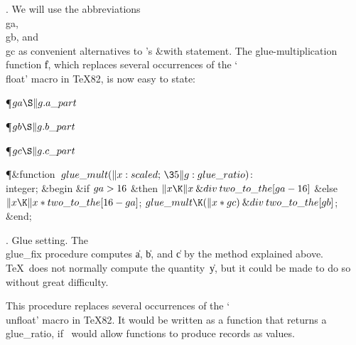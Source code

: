 . We will use the abbreviations \\{ga}, \\{gb}, and \\{gc} as convenient
alternatives to \PASCAL's \&{with} statement. The glue-multiplication
function \|f, which replaces several occurrences of the `\\{float}' macro
in \TeX82, is now easy to state:

\Y\P\D {}$\\{ga}\S\|g.\\{a\_part}$\par
\P\D {}$\\{gb}\S\|g.\\{b\_part}$\par
\P\D {}$\\{gc}\S\|g.\\{c\_part}$\par
\Y\P\4\&{function}\1\  $\\{glue\_mult}(\|x:\\{scaled};\,\35\|g:\\{glue%
\_ratio})$: \\{integer};\2\6
\&{begin} \&{if} $\\{ga}>16$ \1\&{then}\5
$\|x\K\|x\mathbin{\&{div}}\\{two\_to\_the}[\\{ga}-16]$\6
\4\&{else} $\|x\K\|x\ast\\{two\_to\_the}[16-\\{ga}]$;\2\6
$\\{glue\_mult}\K(\|x\ast\\{gc})\mathbin{\&{div}}\\{two\_to\_the}[\\{gb}]$;%
\6
\&{end};\par
\fi

. Glue setting.
The \\{glue\_fix} procedure computes \|a, \|b, and \|c by the method
explained above. \TeX\ does not normally compute the quantity~\|y, but
it could be made to do so without great difficulty.

This procedure replaces several occurrences of the `\\{unfloat}' macro in
\TeX82. It would be written as a function that returns a \\{glue\_ratio},
if \PASCAL\ would allow functions to produce records as values.

